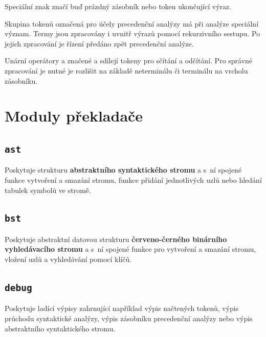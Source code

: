 \documentclass[a4paper, 11pt]{article}
\begin{document}
    Speciální znak \uv{\texttt{\$}} značí buď prázdný zásobník nebo token ukončující výraz.

    Skupina tokenů označená pro účely precedenční analýzy  má při analýze speciální význam.
    Termy jsou zpracovány i uvnitř výrazů pomocí rekurzivního sestupu. Po jejich zpracování je řízení předáno zpět
    precedenční analýze.

    Unární operátory \uv{\texttt{+}} a \uv{\texttt{-}} značené  a  sdílejí
    tokeny pro sčítání a odčítání. Pro správné zpracování je nutné je rozlišit na základě neterminálu či terminálu
    na vrcholu zásobníku.

    \setlength{\tabcolsep}{3pt}
    

    \newpage

    \section{Moduly překladače}

    \subsection{\texttt{ast}}
    \label{module:ast}
    \vspace{-0.5em}
        Poskytuje strukturu \textbf{abstraktního syntaktického stromu} a s~ní spojené funkce vytvoření
        a smazání stromu, funkce přidání jednotlivých uzlů nebo hledání tabulek symbolů ve stromě.

    \vspace{-1em}
    \subsection{\texttt{bst}}
    \label{module:bst}
    \vspace{-0.5em}
        Poskytuje abstraktní datovou strukturu \textbf{červeno-černého binárního vyhledávacího stromu}
        a s~ní spojené funkce pro vytvoření a smazání stromu, vložení uzlů a vyhledávání pomocí klíčů.

    \vspace{-1em}
    \subsection{\texttt{debug}}
    \label{module:debug}
    \vspace{-0.5em}
        Poskytuje ladící výpisy zahrnující například výpis načtených tokenů,
        výpis průchodu syntaktické analýzy, výpis zásobníku precedenční analýzy nebo výpis abstraktního
        syntaktického stromu.
\end{document}
